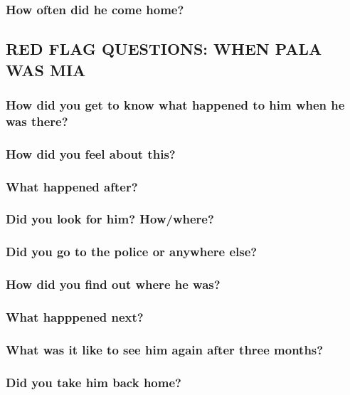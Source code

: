 \documentclass[11pt]{article}
\begin{document}
\subsubsection{How often did he come home?}
\label{sec:orgc884f4e}

\subsection{RED FLAG QUESTIONS: WHEN PALA WAS MIA}
\label{sec:org372ec30}

\subsubsection{How did you get to know what happened to him when he was there?}
\label{sec:orgdd27365}
\subsubsection{How did you feel about this?}
\label{sec:org1f20a27}
\subsubsection{What happened after?}
\label{sec:org0adfecf}
\subsubsection{Did you look for him? How/where?}
\label{sec:org7d56c42}
\subsubsection{Did you go to the police or anywhere else?}
\label{sec:org1849c9a}
\subsubsection{How did you find out where he was?}
\label{sec:org16e0f38}
\subsubsection{What happpened next?}
\label{sec:orga64b6ac}
\subsubsection{What was it like to see him again after three months?}
\label{sec:orgca0f062}
\subsubsection{Did you take him back home?}
\label{sec:orgeb9df64}
\end{document}
